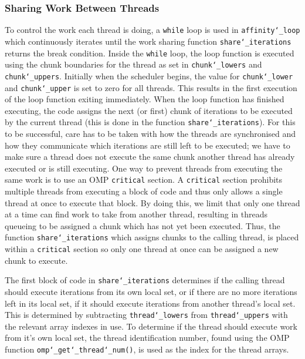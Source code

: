 \documentclass[11pt, a4paper]{article}
\begin{document}
			\subsubsection{Sharing Work Between Threads} \label{sect:sharing_work}
				To control the work each thread is doing, a \texttt{while} loop is used in \texttt{affinity\char`_loop} which continuously iterates until the work sharing function \texttt{share\char`_iterations} returns the break condition. Inside the \texttt{while} loop, the loop function is executed using the chunk boundaries for the thread as set in \texttt{chunk\char`_lowers} and \texttt{chunk\char`_uppers}.  Initially when the scheduler begins, the value for \texttt{chunk\char`_lower} and \texttt{chunk\char`_upper} is set to zero for all threads. This results in the first execution of the loop function exiting immediately. When the loop function has finished executing, the code assigns the next (or first) chunk of iterations to be executed by the current thread (this is done in the function \texttt{share\char`_iterations}). For this to be successful, care has to be taken with how the threads are synchronised and how they communicate which iterations are still left to be executed; we have to make sure a thread does not execute the same chunk another thread has already executed or is still executing. One way to prevent threads from executing the same work is to use an OMP \texttt{critical} section. A \texttt{critical} section prohibits multiple threads from executing a block of code and thus only allows a single thread at once to execute that block. By doing this, we limit that only one thread at a time can find work to take from another thread, resulting in threads queueing to be assigned a chunk which has not yet been executed. Thus, the function \texttt{share\char`_iterations} which assigns chunks to the calling thread, is placed within a \texttt{critical} section so only one thread at once can be assigned a new chunk to execute.
				
				The first block of code in \texttt{share\char`_iterations} determines if the calling thread should execute iterations from its own local set, or if there are no more iterations left in its local set, if it should execute iterations from another thread's local set. This is determined by subtracting \texttt{thread\char`_lowers} from \texttt{thread\char`_uppers} with the relevant array indexes in use. To determine if the thread should execute work from it's own local set, the thread identification number, found using the OMP function \texttt{omp\char`_get\char`_thread\char`_num()}, is used as the index for the thread arrays.
				
\end{document}
